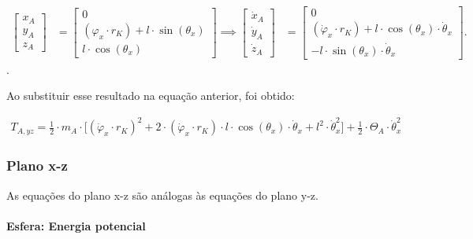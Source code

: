 \begin{equation*}
    \begin{aligned}
        \begin{bmatrix}
            x_A \\
            y_A \\
            z_A
        \end{bmatrix} 
        & =
        \begin{bmatrix}
            0 \\
            (\varphi_x \cdot r_K ) + l \cdot \sin(\theta_x) \\
            l \cdot \cos(\theta_x)
        \end{bmatrix}
        \implies
        \begin{bmatrix}
            \dot x_A \\
            \dot y_A \\
            \dot z_A
        \end{bmatrix}
        & =
        \begin{bmatrix}
            0 \\
            (\dot \varphi_x \cdot r_K ) + l \cdot \cos({\theta_x}) \cdot \dot \theta_x \\
            - l \cdot \sin({\theta_x}) \cdot \dot \theta_x
        \end{bmatrix}.
    \end{aligned}
\end{equation*}.

Ao substituir esse resultado na equação anterior, foi obtido:

\begin{equation*}
    \begin{aligned}
        T_{A,yz} = \frac{1}{2} \cdot m_A \cdot \Big[ (\dot{\varphi}_x \cdot r_K)^2 + 2 \cdot (\dot{\varphi}_x \cdot r_K) \cdot l \cdot \cos(\theta_x) \cdot \dot{\theta}_x + l^2 \cdot \dot{\theta}_x^2 \Big] + \frac{1}{2} \cdot \Theta_A \cdot \dot \theta_x^2
    \end{aligned}
\end{equation*}

\subsubsection{Plano x-z}

As equações do plano x-z são análogas às equações do plano y-z.

\paragraph{Esfera: Energia potencial}

